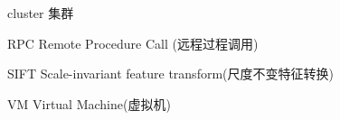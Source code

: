 \begin{denotation}[3cm]
\item[cluster] 集群
\item[RPC] Remote Procedure Call (远程过程调用)
\item[SIFT] Scale-invariant feature transform(尺度不变特征转换)
\item[VM] Virtual Machine(虚拟机)
\end{denotation}
